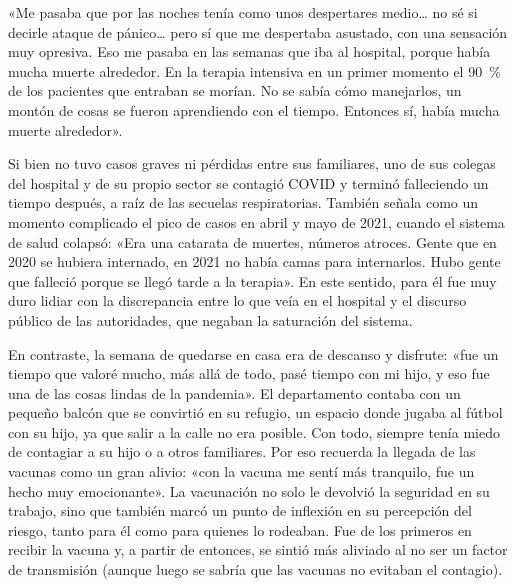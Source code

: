 \begin{refsection}
\begin{gbcita}
«Me pasaba que por las noches tenía como unos despertares medio… no sé si decirle ataque de pánico… pero sí que me despertaba asustado, con una sensación muy opresiva. Eso me pasaba en las semanas que iba al hospital, porque había mucha muerte alrededor. En la terapia intensiva en un primer momento el \SI{90}{\percent} de los pacientes que entraban se morían. No se sabía cómo manejarlos, un montón de cosas se fueron aprendiendo con el tiempo. Entonces sí, había mucha muerte alrededor».

\end{gbcita}

Si bien no tuvo casos graves ni pérdidas entre sus familiares, uno de sus colegas del hospital y de su propio sector se contagió COVID y terminó falleciendo un tiempo después, a raíz de las secuelas respiratorias. También señala como un momento complicado el pico de casos en abril y mayo de 2021, cuando el sistema de salud colapsó: «Era una catarata de muertes, números atroces. Gente que en 2020 se hubiera internado, en 2021 no había camas para internarlos. Hubo gente que falleció porque se llegó tarde a la terapia». En este sentido, para él fue muy duro lidiar con la discrepancia entre lo que veía en el hospital y el discurso público de las autoridades, que negaban la saturación del sistema.

En contraste, la semana de quedarse en casa era de descanso y disfrute: «fue un tiempo que valoré mucho, más allá de todo, pasé tiempo con mi hijo, y eso fue una de las cosas lindas de la pandemia». El departamento contaba con un pequeño balcón que se convirtió en su refugio, un espacio donde jugaba al fútbol con su hijo, ya que salir a la calle no era posible. Con todo, siempre tenía miedo de contagiar a su hijo o a otros familiares. Por eso recuerda la llegada de las vacunas como un gran alivio: «con la vacuna me sentí más tranquilo, fue un hecho muy emocionante». La vacunación no solo le devolvió la seguridad en su trabajo, sino que también marcó un punto de inflexión en su percepción del riesgo, tanto para él como para quienes lo rodeaban. Fue de los primeros en recibir la vacuna y, a partir de entonces, se sintió más aliviado al no ser un factor de transmisión (aunque luego se sabría que las vacunas no evitaban el contagio).


\end{refsection}
